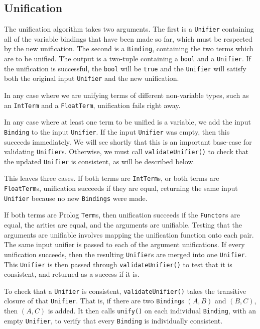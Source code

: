 \documentclass[12pt]{article}
\begin{document}
\subsection{Unification}

The unification algorithm takes two arguments. 
The first is a \verb|Unifier| containing all of the variable bindings that have been made so far, which must be respected by the new unification. 
The second is a \verb|Binding|, containing the two terms which are to be unified. 
The output is a two-tuple containing a \verb|bool| and a \verb|Unifier|. 
If the unification is successful, the \verb|bool| will be \verb|true| and the \verb|Unifier| will satisfy both the original input \verb|Unifier| and the new unification.

In any case where we are unifying terms of different non-variable types, such as an \verb|IntTerm| and a \verb|FloatTerm|, unification fails right away. 

In any case where at least one term to be unified is a variable, we add the input \verb|Binding| to the input \verb|Unifier|. 
If the input \verb|Unifier| was empty, then this succeeds immediately. 
We will see shortly that this is an important base-case for validating \verb|Unifier|s. 
Otherwise, we must call \verb|validateUnifier()| to check that the updated \verb|Unifier| is consistent, as will be described below.

This leaves three cases. 
If both terms are \verb|IntTerm|s, or both terms are \verb|FloatTerm|s, unification succeeds if they are equal, returning the same input \verb|Unifier| because no new \verb|Bindings| were made. 

If both terms are Prolog \verb|Term|s, then unification succeeds if the \verb|Functor|s are equal, the arities are equal, and the arguments are unifiable. 
Testing that the arguments are unifiable involves mapping the unification function onto each pair. 
The same input unifier is passed to each of the argument unifications. 
If every unification succeeds, then the resulting \verb|Unifier|s are merged into one \verb|Unifier|. 
This \verb|Unifier| is then passed through \verb|validateUnifier()| to test that it is consistent, and returned as a success if it is.

To check that a \verb|Unifier| is consistent, \verb|validateUnifier()| takes the transitive closure of that \verb|Unifier|. 
That is, if there are two \verb|Binding|s $(A, B)$ and $(B, C)$, then $(A, C)$ is added. 
It then calls \verb|unify()| on each individual \verb|Binding|, with an empty \verb|Unifier|, to verify that every \verb|Binding| is individually consistent.
\end{document}
